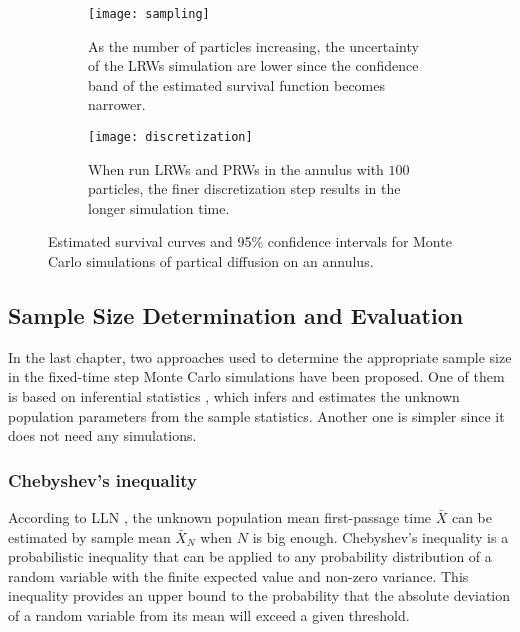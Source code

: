
\begin{figure}
  \begin{subfigure}{0.9\textwidth}
    \centering
    \texttt{[image: sampling]}
    \caption{As the number of particles increasing, the uncertainty
    of the LRWs simulation are lower since the confidence band of the
    estimated survival function becomes narrower.\label{fig:annulus_more_particles}}
  \end{subfigure}
  \begin{subfigure}{0.9\textwidth}
    \centering
    \texttt{[image: discretization]}
    \caption{When run LRWs and PRWs in the annulus with $100$
      particles, the finer discretization step results in the longer
      simulation time.\label{fig:annulus_finer_steps}}
  \end{subfigure}
  \caption{Estimated survival curves and 95\% confidence intervals for Monte Carlo simulations of partical diffusion on an annulus.\label{fig:lrw_prw_annulus}}
\end{figure}


\subsection{Sample Size Determination and Evaluation}

In the last chapter, two approaches used to determine the appropriate
sample size in the fixed-time step Monte Carlo simulations have been
proposed. One of them is based on inferential statistics
\cite{casella2002statistical}, which infers and estimates the unknown
population parameters from the sample statistics. Another one is
simpler since it does not need any simulations.

\subsubsection{Chebyshev's inequality}

According to LLN \cite{dekking2005modern}, the unknown population mean
first-passage time $\bar X$ can be estimated by sample mean $\bar X_N$
when $N$ is big enough. Chebyshev’s inequality
\cite{chebyshev1867valeurs} is a probabilistic inequality that can be
applied to any probability distribution of a random variable with the
finite expected value and non-zero variance. This inequality provides
an upper bound to the probability that the absolute deviation of a
random variable from its mean will exceed a given threshold.

